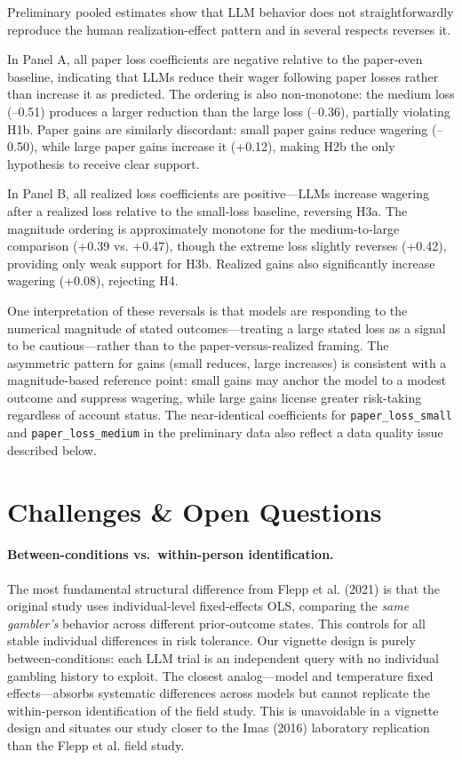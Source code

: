 \documentclass[midterm]{sparreport}
\begin{document}
Preliminary pooled estimates show that LLM behavior does not straightforwardly
reproduce the human realization-effect pattern and in several respects reverses it.

In Panel A, all paper loss coefficients are negative relative to the paper-even
baseline, indicating that LLMs reduce their wager following paper losses rather
than increase it as predicted. The ordering is also non-monotone: the medium loss
(--0.51) produces a larger reduction than the large loss (--0.36), partially
violating H1b. Paper gains are similarly discordant: small paper gains reduce
wagering (--0.50), while large paper gains increase it (+0.12), making H2b the
only hypothesis to receive clear support.

In Panel B, all realized loss coefficients are positive---LLMs increase wagering
after a realized loss relative to the small-loss baseline, reversing H3a. The
magnitude ordering is approximately monotone for the medium-to-large comparison
(+0.39 vs. +0.47), though the extreme loss slightly reverses (+0.42), providing
only weak support for H3b. Realized gains also significantly increase wagering
(+0.08), rejecting H4.

One interpretation of these reversals is that models are responding to the
numerical magnitude of stated outcomes---treating a large stated loss as a signal
to be cautious---rather than to the paper-versus-realized framing. The asymmetric
pattern for gains (small reduces, large increases) is consistent with a
magnitude-based reference point: small gains may anchor the model to a modest
outcome and suppress wagering, while large gains license greater risk-taking
regardless of account status. The near-identical coefficients for \texttt{paper\_loss\_small}
and \texttt{paper\_loss\_medium} in the preliminary data also reflect a data quality
issue described below.

\section{Challenges \& Open Questions}

\paragraph{Between-conditions vs.\ within-person identification.}
The most fundamental structural difference from Flepp et al. (2021) is that the
original study uses individual-level fixed-effects OLS, comparing the \emph{same
gambler's} behavior across different prior-outcome states. This controls for all
stable individual differences in risk tolerance. Our vignette design is purely
between-conditions: each LLM trial is an independent query with no individual
gambling history to exploit. The closest analog---model and temperature fixed
effects---absorbs systematic differences across models but cannot replicate the
within-person identification of the field study. This is unavoidable in a vignette
design and situates our study closer to the Imas (2016) laboratory replication
than the Flepp et al. field study.
\end{document}
